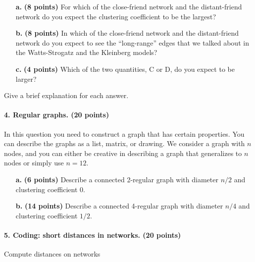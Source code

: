 \documentclass[11pt]{article} %
\begin{document}
\begin{enumerate}
\item[\textbf{a.}]  \textbf{(8 points)} For which of the close-friend network and the distant-friend network do you expect the clustering coefficient to be the largest?
\item[\textbf{b.}]  \textbf{(8 points)} In which of the close-friend network and the distant-friend network do you expect to see the ``long-range'' edges that we talked about in the Watts-Strogatz and the Kleinberg models?
\item[\textbf{c.}]  \textbf{(4 points)} Which of the two quantities, C or D, do you expect to be larger?
\end{enumerate}
Give a brief explanation for each answer.

\paragraph{4. Regular graphs. (20 points)}  In this question you need to construct a graph that has certain properties.  You can describe the graphs as a list, matrix, or drawing.  We consider a graph with $n$ nodes, and you can either be creative in describing a graph that generalizes to $n$ nodes or simply use $n=12$.
\begin{enumerate}
\item[\textbf{a.}]\textbf{(6 points)}  Describe a connected 2-regular graph with diameter $n/2$ and clustering coefficient 0.
\item[\textbf{b.}] \textbf{(14 points)} Describe a connected 4-regular graph with diameter $n/4$ and clustering coefficient $1/2$.
\end{enumerate}


\paragraph{5. Coding: short distances in networks. (20 points)} Compute distances on networks
\end{document}
